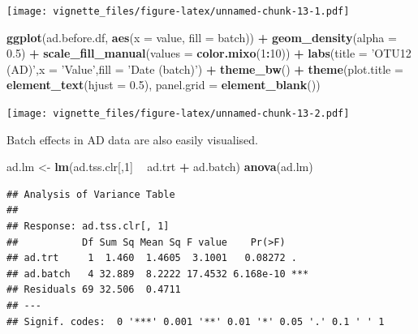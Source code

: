 \documentclass[]{book}
\newenvironment{Shaded}{\begin{snugshade}}{\end{snugshade}}
\newcommand{\KeywordTok}[1]{\textcolor[rgb]{0.13,0.29,0.53}{\textbf{#1}}}
\newcommand{\DataTypeTok}[1]{\textcolor[rgb]{0.13,0.29,0.53}{#1}}
\newcommand{\DecValTok}[1]{\textcolor[rgb]{0.00,0.00,0.81}{#1}}
\newcommand{\FloatTok}[1]{\textcolor[rgb]{0.00,0.00,0.81}{#1}}
\newcommand{\StringTok}[1]{\textcolor[rgb]{0.31,0.60,0.02}{#1}}
\newcommand{\OperatorTok}[1]{\textcolor[rgb]{0.81,0.36,0.00}{\textbf{#1}}}
\newcommand{\NormalTok}[1]{#1}
\begin{document}
\texttt{[image: vignette\_files/figure-latex/unnamed-chunk-13-1.pdf]}

\begin{Shaded}
\begin{Highlighting}[]
\KeywordTok{ggplot}\NormalTok{(ad.before.df, }\KeywordTok{aes}\NormalTok{(}\DataTypeTok{x =}\NormalTok{ value, }\DataTypeTok{fill =}\NormalTok{ batch)) }\OperatorTok{+}\StringTok{ }
\StringTok{  }\KeywordTok{geom_density}\NormalTok{(}\DataTypeTok{alpha =} \FloatTok{0.5}\NormalTok{) }\OperatorTok{+}\StringTok{ }\KeywordTok{scale_fill_manual}\NormalTok{(}\DataTypeTok{values =} \KeywordTok{color.mixo}\NormalTok{(}\DecValTok{1}\OperatorTok{:}\DecValTok{10}\NormalTok{)) }\OperatorTok{+}\StringTok{ }
\StringTok{  }\KeywordTok{labs}\NormalTok{(}\DataTypeTok{title =} \StringTok{'OTU12 (AD)'}\NormalTok{,}\DataTypeTok{x =} \StringTok{'Value'}\NormalTok{,}\DataTypeTok{fill =} \StringTok{'Date (batch)'}\NormalTok{) }\OperatorTok{+}\StringTok{ }
\StringTok{  }\KeywordTok{theme_bw}\NormalTok{() }\OperatorTok{+}\StringTok{ }\KeywordTok{theme}\NormalTok{(}\DataTypeTok{plot.title =} \KeywordTok{element_text}\NormalTok{(}\DataTypeTok{hjust =} \FloatTok{0.5}\NormalTok{), }
                     \DataTypeTok{panel.grid =} \KeywordTok{element_blank}\NormalTok{())}
\end{Highlighting}
\end{Shaded}

\texttt{[image: vignette\_files/figure-latex/unnamed-chunk-13-2.pdf]}

Batch effects in AD data are also easily visualised.

\begin{Shaded}
\begin{Highlighting}[]
\NormalTok{ad.lm <-}\StringTok{ }\KeywordTok{lm}\NormalTok{(ad.tss.clr[,}\DecValTok{1}\NormalTok{] }\OperatorTok{~}\StringTok{ }\NormalTok{ad.trt }\OperatorTok{+}\StringTok{ }\NormalTok{ad.batch)}
\KeywordTok{anova}\NormalTok{(ad.lm)}
\end{Highlighting}
\end{Shaded}

\begin{verbatim}
## Analysis of Variance Table
## 
## Response: ad.tss.clr[, 1]
##           Df Sum Sq Mean Sq F value    Pr(>F)    
## ad.trt     1  1.460  1.4605  3.1001   0.08272 .  
## ad.batch   4 32.889  8.2222 17.4532 6.168e-10 ***
## Residuals 69 32.506  0.4711                      
## ---
## Signif. codes:  0 '***' 0.001 '**' 0.01 '*' 0.05 '.' 0.1 ' ' 1
\end{verbatim}
\end{document}
